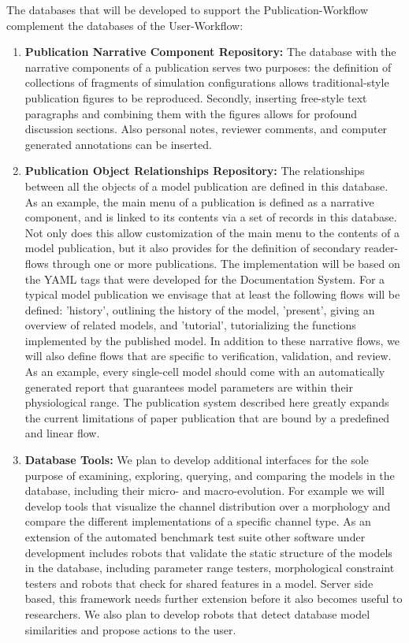 \documentclass[12pt]{article}
\begin{document}
\begin{enumerate}
The databases that will be developed to support the Publication-Workflow complement the databases of the User-Workflow:
\begin{enumerate}
\item {\bf Publication Narrative Component Repository:} The database with the narrative components of a publication serves two purposes: the definition of collections of fragments of simulation configurations allows traditional-style publication figures to be reproduced. Secondly, inserting free-style text paragraphs and combining them with the figures allows for profound discussion sections. Also personal notes, reviewer comments, and computer generated annotations can be inserted.
\item {\bf Publication Object Relationships Repository:} The relationships between all the objects of a model publication are defined in this database. As an example, the main menu of a publication is defined as a narrative component, and is linked to its contents via a set of records in this database. Not only does this allow customization of the main menu to the contents of a model publication, but it also provides for the definition of secondary reader-flows through one or more publications. The implementation will be based on the YAML tags that were developed for the Documentation System. For a typical model publication we envisage that at least the following flows will be defined: 'history', outlining the history of the model, 'present', giving an overview of related models, and 'tutorial', tutorializing the functions implemented by the published model. In addition to these narrative flows, we will also define flows that are specific to verification, validation, and review. As an example, every single-cell model should come with an automatically generated report that guarantees model parameters are within their physiological range. The publication system described here greatly expands the current limitations of paper publication that are bound by a predefined and linear flow.
\item {\bf Database Tools:} We plan to develop additional interfaces for the sole purpose of examining, exploring, querying, and comparing the models in the database, including their micro- and macro-evolution.  For example we will develop tools that visualize the channel distribution over a morphology and compare the different implementations of a specific channel type.  As an extension of the automated benchmark test suite other software under development includes robots that validate the static structure of the models in the database, including parameter range testers, morphological constraint testers and robots that check for shared features in a model. Server side based, this framework needs further extension before it also becomes useful to researchers. We also plan to develop robots that detect database model similarities and propose actions to the user.

\end{enumerate}
\end{enumerate}
\end{document}
